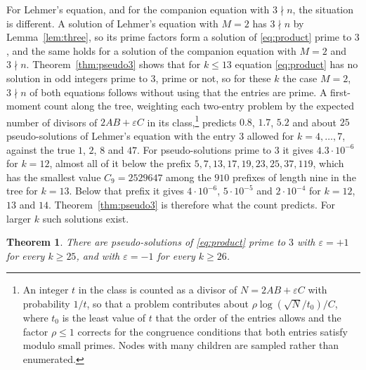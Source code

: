 \documentclass[11pt,reqno]{amsart}
\numberwithin{equation}{section}
\theoremstyle{plain}
\newtheorem{theorem}{Theorem}[section]
\theoremstyle{definition}
\theoremstyle{remark}
\begin{document}
For Lehmer's equation, and for the companion equation with $3\nmid n$,
the situation is different. A solution of Lehmer's equation with
$M=2$ has $3\nmid n$ by Lemma~\ref{lem:three}, so its prime factors
form a solution of \eqref{eq:product} prime to $3$, and the same holds
for a solution of the companion equation with $M=2$ and $3\nmid n$.
Theorem~\ref{thm:pseudo3} shows that for $k\le13$ equation
\eqref{eq:product} has no solution in odd integers prime to $3$, prime
or not, so for these $k$ the case $M=2$, $3\nmid n$ of both equations
follows without using that the entries are prime. A first-moment count
along the tree, weighting each two-entry problem by the expected number
of divisors of $2AB+\varepsilon C$ in its class,\footnote{An integer
$t$ in the class is counted as a divisor of $N=2AB+\varepsilon C$ with
probability $1/t$, so that a problem contributes about
$\rho\log(\sqrt N/t_0)/C$, where $t_0$ is the least value of $t$ that
the order of the entries allows and the factor $\rho\le1$ corrects for
the congruence conditions that both entries satisfy modulo small
primes. Nodes
with many children are sampled rather than enumerated.} predicts $0.8$, $1.7$,
$5.2$ and about $25$ pseudo-solutions of Lehmer's equation with the
entry $3$ allowed for $k=4,\dots,7$, against the true $1$, $2$, $8$
and $47$. For pseudo-solutions prime to $3$ it gives $4.3\cdot10^{-6}$
for $k=12$, almost all of it below the prefix
$5,7,13,17,19,23,25,37,119$, which has the smallest value
$C_9=2529647$ among the $910$ prefixes of length nine in the tree for
$k=13$. Below that prefix it gives $4\cdot10^{-6}$, $5\cdot10^{-5}$
and $2\cdot10^{-4}$ for $k=12$, $13$ and $14$.
Theorem~\ref{thm:pseudo3} is therefore what the count predicts. For larger $k$ such solutions exist.

\begin{theorem}\label{thm:pseudo25}
There are pseudo-solutions of \eqref{eq:product} prime to $3$ with
$\varepsilon=+1$ for every $k\ge25$, and with $\varepsilon=-1$ for
every $k\ge26$.
\end{theorem}
\end{document}
